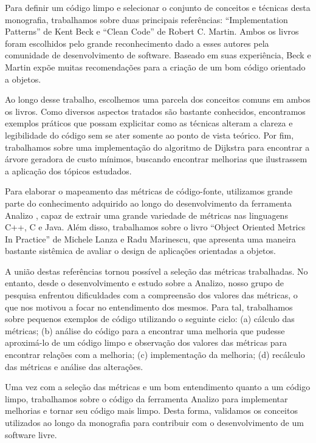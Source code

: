 Para definir um código limpo e selecionar o conjunto de conceitos e técnicas desta monografia, trabalhamos sobre duas principais referências: 
``Implementation Patterns'' \citep{Beck2007} de Kent Beck e ``Clean Code'' \citep{Martin2008} de Robert C. Martin. Ambos os livros foram escolhidos 
pelo grande reconhecimento dado a esses autores pela comunidade de desenvolvimento de software. Baseado em suas experiência, Beck e Martin 
expõe muitas recomendações para a criação de um bom código orientado a objetos.

Ao longo desse trabalho, escolhemos uma parcela dos conceitos comuns em ambos os livros. Como diversos aspectos tratados são bastante 
conhecidos, encontramos exemplos práticos que possam explicitar como as técnicas alteram a clareza e legibilidade do código sem se ater 
somente ao ponto de vista teórico. Por fim, trabalhamos sobre uma implementação do algoritmo de Dijkstra para encontrar a árvore geradora de 
custo mínimos, buscando encontrar melhorias que ilustrassem a aplicação dos tópicos estudados.

Para elaborar o mapeamento das métricas de código-fonte, utilizamos grande parte do conhecimento adquirido ao longo do desenvolvimento da 
ferramenta Analizo \cite{analizo2010}, capaz de extrair uma grande variedade de métricas nas linguagens C++, C e Java.
Além disso, trabalhamos sobre o livro ``Object Oriented Metrics In Practice'' \cite{Lanza06} de Michele Lanza e Radu Marinescu, que apresenta uma 
maneira bastante sistêmica de avaliar o design de aplicações orientadas a objetos. 

A união destas referências tornou possível a seleção das métricas trabalhadas. No entanto, desde o desenvolvimento e estudo sobre a Analizo, nosso grupo 
de pesquisa enfrentou dificuldades com a compreensão dos valores das métricas, o que nos motivou a focar no entendimento dos mesmos. Para tal, 
trabalhamos sobre pequenos exemplos de código utilizando o seguinte ciclo: (a) cálculo das métricas; (b) análise do código para a encontrar uma melhoria 
que pudesse aproximá-lo de um código limpo e observação dos valores das métricas para encontrar relações com a melhoria; (c) implementação da melhoria; 
(d) recálculo das métricas e análise das alterações.

Uma vez com a seleção das métricas e um bom entendimento quanto a um código limpo, trabalhamos sobre o código da ferramenta Analizo para implementar 
melhorias e tornar seu código mais limpo. Desta forma, validamos os conceitos utilizados ao longo da monografia para contribuir com o desenvolvimento de 
um software livre.

